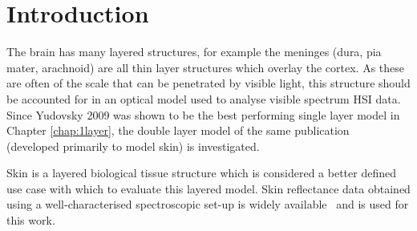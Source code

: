 
\section{Introduction}\label{sec:intro2}
The brain has many layered structures, for example the meninges (dura, pia mater, arachnoid) are all thin layer structures which overlay the cortex. As these are often of the scale that can be penetrated by visible light, this structure should be accounted for in an optical model used to analyse visible spectrum HSI data. Since Yudovsky 2009 was shown to be the best performing single layer model in Chapter \ref{chap:1layer}, the double layer model of the same publication~\citep{Yudovsky2009} (developed primarily to model skin) is investigated. 

Skin is a layered biological tissue structure which is considered a better defined use case with which to evaluate this layered model. Skin reflectance data obtained using a well-characterised spectroscopic set-up is widely available~\citep{Cooksey2017} and is used for this work. 



